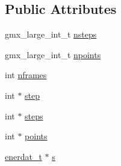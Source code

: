 \subsection*{\-Public \-Attributes}
\begin{DoxyCompactItemize}
\item 
gmx\-\_\-large\-\_\-int\-\_\-t \hyperlink{structenerdata__t_a7d5406fd186b3dbda4b369e28a686892}{nsteps}
\item 
gmx\-\_\-large\-\_\-int\-\_\-t \hyperlink{structenerdata__t_a7b89847f7885a2e96b4a155cc115b4d0}{npoints}
\item 
int \hyperlink{structenerdata__t_abc8698bcd3c339c6c1ec9890ca5c43db}{nframes}
\item 
int $\ast$ \hyperlink{structenerdata__t_a80295602c856ebf6ca08e81e54f20bac}{step}
\item 
int $\ast$ \hyperlink{structenerdata__t_a77f55afb5feb54738e9ec8b1f65b58c4}{steps}
\item 
int $\ast$ \hyperlink{structenerdata__t_a665529cf8054436be084db2860fe380b}{points}
\item 
\hyperlink{structenerdat__t}{enerdat\-\_\-t} $\ast$ \hyperlink{structenerdata__t_abdb22705be9e317bd25c88a9eac57db0}{s}
\end{DoxyCompactItemize}


